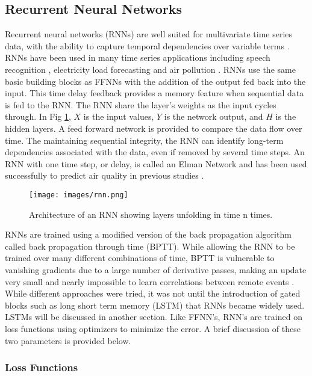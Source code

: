 \documentclass[preprint,12pt,authoryear]{elsarticle}
\begin{document}
\begin{linenumbers}
\subsection{Recurrent Neural Networks}
Recurrent neural networks (RNNs) are well suited for multivariate time series data, with the ability to capture temporal dependencies over variable terms \citep{Che2016}. RNNs have been used in many time series applications including speech recognition \citep{Graves2013}, electricity load forecasting \citep{Walid2017} and air pollution \citep{Biancofiore2017}. RNNs use the same basic building blocks as FFNNs with the addition of the output fed back into the input. This time delay feedback provides a memory feature when sequential data is fed to the RNN. The RNN share the layer's weights as the input cycles through. In Fig \ref{fig:rnn}, $X$ is the input values, $Y$ is the network output, and $H$ is the hidden layers. A feed forward network is provided to compare the data flow over time. The maintaining sequential integrity, the RNN can identify long-term dependencies associated with the data, even if removed by several time steps. An RNN with one time step, or delay, is called an Elman Network and has been used successfully to predict air quality in previous studies \citep{Biancofiore2015}.

%
\begin{figure}[H]
\centering
\texttt{[image: images/rnn.png]}  %
\caption{Architecture of an RNN showing layers unfolding in time n times.}
\label{fig:rnn}
\end{figure}
%

RNNs are trained using a modified version of the back propagation algorithm called back propagation through time (BPTT). While allowing the RNN to be trained over many different combinations of time, BPTT is vulnerable to vanishing gradients due to a large number of derivative passes, making an update very small and nearly impossible to learn correlations between remote events \citep{Pascanu2013}. While different approaches were tried, it was not until the introduction of gated blocks such as long short term memory (LSTM) that RNNs became widely used. LSTMs will be discussed in another section. Like FFNN's, RNN's are trained on loss functions using optimizers to minimize the error. A brief discussion of these two parameters is provided below.

\subsubsection{Loss Functions}


\end{linenumbers}
\end{document}

